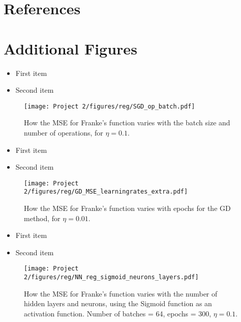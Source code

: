 \documentclass[english,notitlepage,reprint,nofootinbib]{revtex4-2}  %
\begin{document}

\newpage 
\section*{References}
\printbibliography[heading=none]

\appendix
\section{Additional Figures}\label{app: figs}

\begin{itemize}
\color{white}
\item First item
\item Second item
\end{itemize}

\begin{figure}[h!]
    \centering %
    \texttt{[image: Project 2/figures/reg/SGD\_op\_batch.pdf]} 
    \caption{How the MSE for Franke's function varies with the batch size and number of operations, for $\eta=0.1$. }
    \label{fig: a3}
\end{figure}

\begin{itemize}
\color{white}
\item First item
\item Second item
\end{itemize}

\begin{figure}[h!]
    \centering %
    \texttt{[image: Project 2/figures/reg/GD\_MSE\_learningrates\_extra.pdf]} 
    \caption{How the MSE for Franke's function varies with epochs for the GD method, for $\eta=0.01$.}
    \label{fig: extra1}
\end{figure}

\begin{itemize}
\color{white}
\item First item
\item Second item
\end{itemize}

\begin{figure}[h!]
    \centering %
    \texttt{[image: Project 2/figures/reg/NN\_reg\_sigmoid\_neurons\_layers.pdf]} 
    \caption{How the MSE for Franke's function varies with the number of hidden layers and neurons, using the Sigmoid function as an activation function. 
    Number of batches = 64, epochs = 300,  $\eta=0.1$.
    }
    \label{fig: b_sigmoid_1}
\end{figure}
\end{document}
